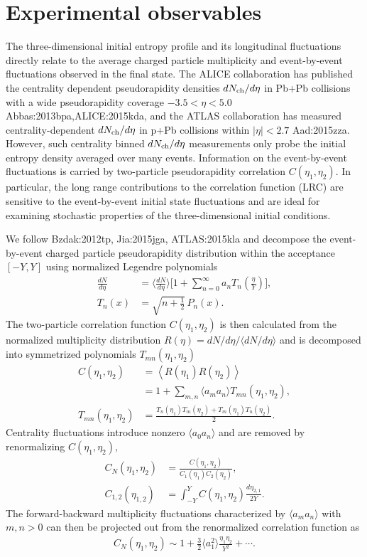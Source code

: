 \section{Experimental observables}
The three-dimensional initial entropy profile and its longitudinal fluctuations directly relate to the average charged particle multiplicity and event-by-event fluctuations observed in the final state. 
The ALICE collaboration has published the centrality dependent pseudorapidity densities $dN_\text{ch}/d\eta$ in Pb+Pb collisions with a wide pseudorapidity coverage $-3.5<\eta<5.0$ {Abbas:2013bpa,ALICE:2015kda}, and the ATLAS collaboration has measured centrality-dependent $dN_\text{ch}/d\eta$ in p+Pb collisions within $|\eta| < 2.7$ {Aad:2015zza}.
However, such centrality binned $dN_\text{ch}/d\eta$ measurements only probe the initial entropy density averaged over many events. 
Information on the event-by-event fluctuations is carried by two-particle pseudorapidity correlation $C(\eta_1, \eta_2)$.
In particular, the long range contributions to the correlation function (LRC) are sensitive to the event-by-event initial state fluctuations and are ideal for examining stochastic properties of the three-dimensional initial conditions.

We follow {Bzdak:2012tp, Jia:2015jga, ATLAS:2015kla} and decompose the event-by-event charged particle pseudorapidity distribution within the acceptance $[-Y, Y]$ using normalized Legendre polynomials
\begin{align}
  \frac{dN}{d\eta} &= \biggl\langle\frac{dN}{d\eta}\biggr\rangle \biggl[1 + \sum_{n=0}^\infty a_n T_n\left(\frac{\eta}{Y}\right) \biggr], \\[.5ex]
  T_n(x) &= \sqrt{n + \frac{1}{2}}\, P_n(x).
\end{align}
The two-particle correlation function $C(\eta_1, \eta_2)$ is then calculated from the normalized multiplicity distribution $R(\eta) = dN/d\eta /\langle dN/d\eta\rangle$ and is decomposed into symmetrized polynomials $T_{mn}(\eta_1, \eta_2)$
\begin{align}
  C(\eta_1, \eta_2) &= \left\langle R(\eta_1) R(\eta_2)\right\rangle \\
  &= 1 + \sum_{m, n}\langle a_m a_n\rangle  T_{mn}(\eta_1, \eta_2),  \\
  T_{mn}(\eta_1, \eta_2) &= \frac{T_n(\eta_1)T_m(\eta_2) + T_m(\eta_1)T_n(\eta_2)}{2}.
\end{align}
Centrality fluctuations introduce nonzero $\langle a_0 a_n\rangle$ and are removed by renormalizing $C(\eta_1, \eta_2)$,
\begin{align}
  C_N(\eta_1, \eta_2) &= \frac{C(\eta_1, \eta_2)}{C_1(\eta_1)C_2(\eta_2)},\\[.5ex]
  C_{1,2}(\eta_{1,2}) &= \int_{-Y}^{Y}C(\eta_1, \eta_2)\frac{d\eta_{2,1}}{2Y}.
\end{align}
The forward-backward multiplicity fluctuations characterized by $\langle a_m a_n\rangle$ with $m, n > 0$ can then be projected out from the renormalized correlation function as
\begin{align}
  C_N(\eta_1, \eta_2) \sim 1 + \frac{3}{2}\langle a_1 ^2 \rangle \frac{\eta_1\eta_2}{Y^2} + \cdots.
\end{align}

